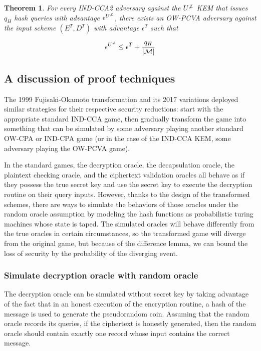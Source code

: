 \documentclass{article}
\newcommand{\norm}[1]{\vert {#1} \vert}
\newtheorem{theorem}{Theorem}[section]
\begin{document}
\begin{theorem}
    For every IND-CCA2 adversary against the $U^{\not\bot}$ KEM that issues $q_H$ hash queries with advantage $\epsilon^{U^{\not\bot}}$, there exists an OW-PCVA adversary against the input scheme $(E^T, D^T)$ with advantage $\epsilon^T$ such that

    \begin{equation*}
        \epsilon^{U^{\not\bot}} \leq \epsilon^T + \frac{q_H}{\norm{\mathcal{M}}}
    \end{equation*}
\end{theorem}

\subsection{A discussion of proof techniques}
The 1999 Fujisaki-Okamoto transformation and its 2017 variations deployed similar strategies for their respective security reductions: start with the appropriate standard IND-CCA game, then gradually transform the game into something that can be simulated by some adversary playing another standard OW-CPA or IND-CPA game (or in the case of the IND-CCA KEM, some adversary playing the OW-PCVA game).

In the standard games, the decryption oracle, the decapsulation oracle, the plaintext checking oracle, and the ciphertext validation oracles all behave as if they possess the true secret key and use the secret key to execute the decryption routine on their query inputs. However, thanks to the design of the transformed schemes, there are ways to simulate the behaviors of those oracles under the random oracle assumption by modeling the hash functions as probabilistic turing machines whose state is taped. The simulated oracles will behave differently from the true oracles in certain circumstances, so the transformed game will diverge from the original game, but because of the difference lemma, we can bound the loss of security by the probability of the diverging event.

\subsubsection{Simulate decryption oracle with random oracle}\label{simulate-dec-oracle}
The decryption oracle can be simulated without secret key by taking advantage of the fact that in an honest execution of the encryption routine, a hash of the message is used to generate the pseudorandom coin. Assuming that the random oracle records its queries, if the ciphertext is honestly generated, then the random oracle should contain exactly one record whose input contains the correct message.
\end{document}
